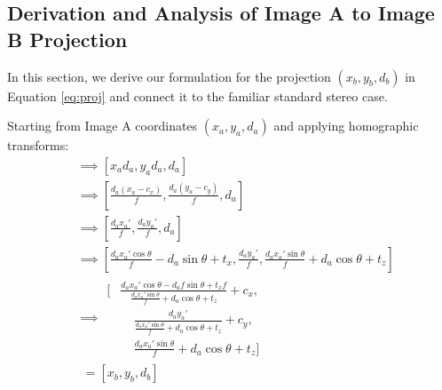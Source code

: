 \documentclass[runningheads, hyperfootnotes=false]{article}
\begin{document}
\subsection{Derivation and Analysis of Image A to Image B Projection}\label{app:theory_proj}
In this section, we derive our formulation for the projection $(x_b, y_b, d_b)$ in Equation \ref{eq:proj} and connect it to the familiar standard stereo case. 

Starting from Image A coordinates $(x_a, y_a, d_a)$ and applying homographic transforms:
\begin{align}
    [x_a, y_a, d_a] &\implies [x_a d_a, y_a d_a, d_a] \tag{Image A Image Hom Coords} \\
    &\implies \left[ \frac{d_a (x_a - c_x)}{f}, \frac{d_a (y_a - c_y)}{f}, d_a \right] \tag{Image A Camera Coords} \\
    &\implies \left[ \frac{d_a x_a'}{f}, \frac{d_a y_a'}{f}, d_a \right] \tag{Let $x_a' = x_a - c_x, y_a' = y_a - c_y$} \\
    &\implies \left[ 
        \frac{d_a x_a' \cos{\theta}}{f} - d_a \sin{\theta} + t_x,
        \frac{d_a y_a'}{f},
        \frac{d_a x_a' \sin{\theta}}{f} + d_a \cos{\theta} + t_z
    \right] \tag{Image B Camera Coords} \\
    &\implies \begin{aligned}\Bigg[&
        \frac{d_a x_a' \cos{\theta} - d_a f \sin{\theta} + t_x f}{\frac{d_a x_a' \sin{\theta}}{f} + d_a \cos{\theta} + t_z} + c_x, \\
        &~~~~~\frac{d_a y_a'}{\frac{d_a x_a' \sin{\theta}}{f} + d_a \cos{\theta} + t_z} + c_y, \\
        &~~~~~\frac{d_a x_a' \sin{\theta}}{f} + d_a \cos{\theta} + t_z
    \Bigg]\end{aligned} \tag{Image B Image Coords} \\
    &~~= [x_b, y_b, d_b] \tag{Image B Image Coords}
\end{align}
\end{document}
